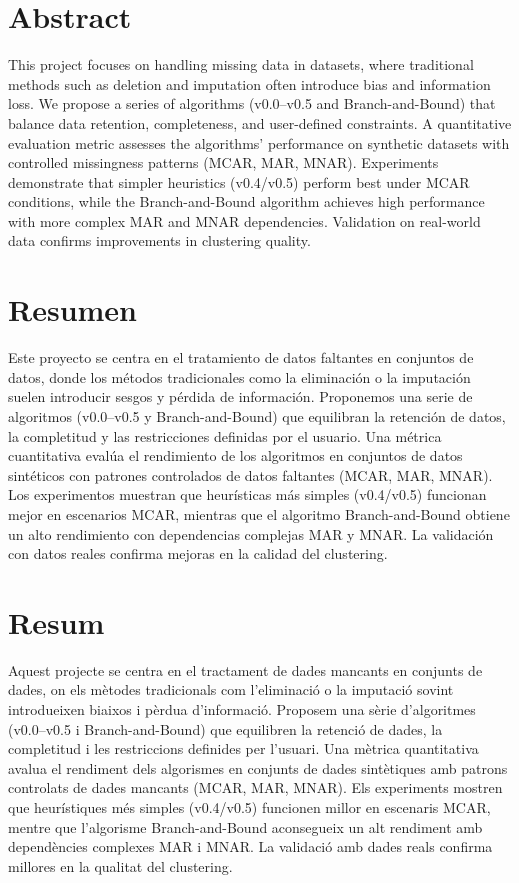 \documentclass[a4paper,12pt]{article}
\begin{document}
\tableofcontents
\newpage
\listoffigures
\listoftables
\newpage

\section*{Abstract}
This project focuses on handling missing data in datasets, where traditional methods such as deletion and imputation often introduce bias and information loss. We propose a series of algorithms (v0.0–v0.5 and Branch-and-Bound) that balance data retention, completeness, and user-defined constraints. A quantitative evaluation metric assesses the algorithms’ performance on synthetic datasets with controlled missingness patterns (MCAR, MAR, MNAR). Experiments demonstrate that simpler heuristics (v0.4/v0.5) perform best under MCAR conditions, while the Branch-and-Bound algorithm achieves high performance with more complex MAR and MNAR dependencies. Validation on real-world data confirms improvements in clustering quality.

\section*{Resumen}
Este proyecto se centra en el tratamiento de datos faltantes en conjuntos de datos, donde los métodos tradicionales como la eliminación o la imputación suelen introducir sesgos y pérdida de información. Proponemos una serie de algoritmos (v0.0–v0.5 y Branch-and-Bound) que equilibran la retención de datos, la completitud y las restricciones definidas por el usuario. Una métrica cuantitativa evalúa el rendimiento de los algoritmos en conjuntos de datos sintéticos con patrones controlados de datos faltantes (MCAR, MAR, MNAR). Los experimentos muestran que heurísticas más simples (v0.4/v0.5) funcionan mejor en escenarios MCAR, mientras que el algoritmo Branch-and-Bound obtiene un alto rendimiento con dependencias complejas MAR y MNAR. La validación con datos reales confirma mejoras en la calidad del clustering.

\section*{Resum}
Aquest projecte se centra en el tractament de dades mancants en conjunts de dades, on els mètodes tradicionals com l’eliminació o la imputació sovint introdueixen biaixos i pèrdua d’informació. Proposem una sèrie d’algoritmes (v0.0–v0.5 i Branch-and-Bound) que equilibren la retenció de dades, la completitud i les restriccions definides per l’usuari. Una mètrica quantitativa avalua el rendiment dels algorismes en conjunts de dades sintètiques amb patrons controlats de dades mancants (MCAR, MAR, MNAR). Els experiments mostren que heurístiques més simples (v0.4/v0.5) funcionen millor en escenaris MCAR, mentre que l’algorisme Branch-and-Bound aconsegueix un alt rendiment amb dependències complexes MAR i MNAR. La validació amb dades reals confirma millores en la qualitat del clustering.
\newpage
\end{document}
